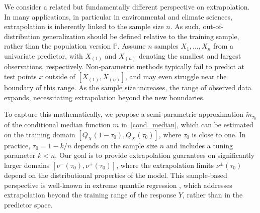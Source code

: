 \documentclass{statsoc}
\theoremstyle{break}
\newcommand{\Ptr}{\mathbb P}
\newcommand{\tauzero}{\tau_0}
\begin{document}
We consider a related but fundamentally different perspective on extrapolation.
In many applications, in particular in environmental and climate sciences, extrapolation is inherently linked to the sample size $n$.
As such, out-of-distribution generalization should be defined relative to the training sample, rather than the population version $\Ptr$.
Assume $n$ samples $X_1,\dots, X_n$ from a univariate predictor, with $X_{(1)}$ and $X_{(n)}$ denoting the smallest and largest observations, respectively. Non-parametric methods typically fail to predict at test points $x$ outside of $[X_{(1)}, X_{(n)}]$, and may even struggle near the boundary of this range. As the sample size increases, the range of observed data expands, necessitating extrapolation beyond the new boundaries. 

To capture this mathematically, we propose a semi-parametric approximation $\tilde m_{\tauzero}$ of the conditional median function $m$ in~\eqref{cond_median}, which can be estimated on the training domain $[Q_X(1-\tauzero), Q_X(\tauzero)]$, where $\tauzero$ is close to one. In practice, $\tauzero = 1-k/n$ depends on the sample size $n$ and includes a tuning parameter $k<n$. Our goal is to provide extrapolation guarantees on significantly larger domains $[\nu^-(\tauzero), \nu^+(\tauzero)]$, where the extrapolation limits $\nu^\pm(\tauzero)$ depend on the distributional properties of the model. This sample-based perspective is well-known in extreme quantile regression \citep[e.g.,][]{che2005,gne2024}, which addresses extrapolation beyond the training range of the response $Y$, rather than in the predictor space.
\end{document}
